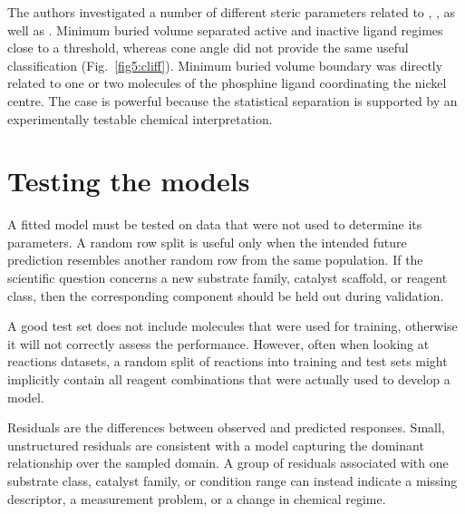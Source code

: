 The authors investigated a number of different steric parameters related to , , as well as .
Minimum buried volume separated active and inactive ligand regimes close to a threshold, whereas cone angle did not provide the same useful classification (Fig.~\ref{fig5:cliff}).
Minimum buried volume boundary was directly related to one or two molecules of the phosphine ligand coordinating the nickel centre.
The case is powerful because the statistical separation is supported by an experimentally testable chemical interpretation.

\begin{warningbox}
\end{warningbox}

\section{Testing the models}

A fitted model must be tested on data that were not used to determine its parameters.
A random row split is useful only when the intended future prediction resembles another random row from the same population.
If the scientific question concerns a new substrate family, catalyst scaffold, or reagent class, then the corresponding component should be held out during validation.

\begin{insightbox}
   A good test set does not include molecules that were used for training, otherwise it will not correctly assess the performance. However, often when looking at reactions datasets, a random split of reactions into training and test sets might implicitly contain all reagent combinations that were actually used to develop a model.
\end{insightbox}

Residuals are the differences between observed and predicted responses.
Small, unstructured residuals are consistent with a model capturing the dominant relationship over the sampled domain.
A group of residuals associated with one substrate class, catalyst family, or condition range can instead indicate a missing descriptor, a measurement problem, or a change in chemical regime.

